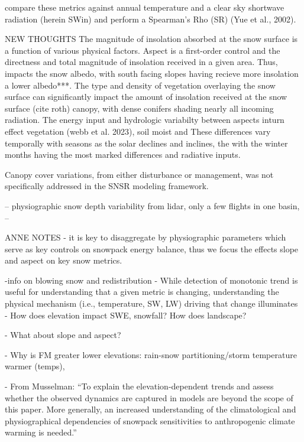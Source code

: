 compare these metrics against annual temperature and a clear sky shortwave radiation (herein SWin) and perform a Spearman’s Rho (SR) (Yue et al., 2002).

NEW THOUGHTS
The magnitude of insolation absorbed at the snow surface is a function of various physical factors. Aspect is a first-order control and the directness and total magnitude of insolation received in a given area. Thus, impacts the snow albedo, with south facing slopes having recieve more insolation a lower albedo***. The type and density of vegetation overlaying the snow surface can significantly impact the amount of insolation received at the snow surface (cite roth) canopy, with dense conifers shading nearly all incoming radiation. The energy input and hydrologic variabilty between aspects inturn effect vegetation (webb et al. 2023), soil moist  and  These differences vary temporally with seasons as the solar declines and inclines, the with the winter months having the most marked differences and radiative inputs.


Canopy cover variations, from either disturbance or management, was not specifically addressed in the SNSR modeling framework.  

-- \citep{kirchnerLiDARMeasurementSeasonal2014, tennantRegionalSensitivitiesSeasonal2017} physiographic snow depth variability from lidar, only a few flights in one basin,
-- 

ANNE NOTES
- it is key to disaggregate by physiographic parameters which serve as key controls on snowpack energy balance, thus we focus the effects slope and aspect on key snow metrics. \

-info on blowing snow and redistribution
- While detection of monotonic trend is useful for understanding that a given metric is changing, understanding the physical mechanism (i.e., temperature, SW, LW) driving that change illuminates 
-	How does elevation impact SWE, snowfall? How does landscape? \

-	What about slope and aspect? \citep{dozierRevisitingTopographicHorizons2022, dozierApproachEnergyBalance1979} \

-	Why is FM greater lower elevations: rain-snow partitioning/storm temperature \citep{huWidespreadWarmingTrends2020} warmer (temps), \

-	From Musselman: “To explain the elevation-dependent trends and assess whether the observed dynamics are captured in models are beyond the scope of this paper. More generally, an increased understanding of the climatological and physiographical dependencies of snowpack sensitivities to anthropogenic climate warming is needed.” \

